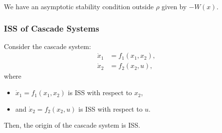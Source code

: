 \newpar{}

We have an asymptotic stability condition outside $\rho$ given by $-W(x)$.

\subsubsection{ISS of Cascade Systems}
Consider the cascade system:
\noindent\begin{align*}
    \dot{x}_1 & = f_1(x_1, x_2), \\
    \dot{x}_2 & = f_2(x_2, u),
\end{align*}
where
\begin{itemize}
    \item $\dot{x}_1 = f_1(x_1, x_2)$ is ISS with respect to $x_2$,
    \item and $\dot{x}_2 = f_2(x_2, u)$ is ISS with respect to $u$.
\end{itemize}
Then, the origin of the cascade system is ISS.\

